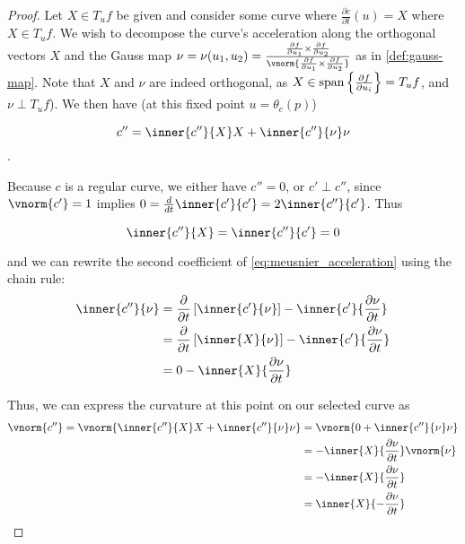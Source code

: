 	\begin{proof}
	Let $X\in T_u f$ be given and consider some curve where $\frac{\partial c}{\partial t}(u) = X$ where $X \in T_u f$. We wish to decompose the curve's acceleration along the  orthogonal vectors $X$ and
	the Gauss map $\nu = \nu(u_1, u_2) =
		\frac{\frac{\partial f}{\partial u_1} \times \frac{\partial f}{\partial u_2}}
		{\vnorm{\frac{\partial f}{\partial u_1} \times \frac{\partial f}{\partial u_2}}}$ as in \cref{def:gauss-map}.
		Note that $X$ and $\nu$ are indeed orthogonal,
		as $ X \in \mathrm{span}\left\{\frac{\partial f}{\partial u_i}\right\} = T_u f$, and
		$\nu \perp T_u f$).
	 We then have (at this fixed point $u=\theta_c(p)$)
		
		\begin{equation} \label{eq:meusnier_acceleration}
			c'' = \inner{c''}{X} X + \inner{c''}{\nu}\nu
			\end{equation}. 
	
	Because $c$ is a regular curve, we either have $c''=0$,
	or $c' \perp c''$, since $\vnorm{c'} = 1$ implies
	$0 = \frac{d}{dt} \inner{c'}{c'} = 2 \inner{c''}{c'} $. Thus
	
		\[ \inner{c''}{X} = \inner{c''}{c'} = 0 \]

	
	 and we can rewrite the second coefficient of \cref{eq:meusnier_acceleration} using the chain rule: %
	\begin{align}
		\inner{c''}{\nu} &=
		\frac{\partial}{\partial t}\left[ \inner{c'}{\nu} \right]
			- \inner{c'}{\frac{\partial \nu}{\partial t}} \\
			&= \frac{\partial}{\partial t}\left[ \inner{X}{\nu} \right]
			- \inner{c'}{\frac{\partial \nu}{\partial t}} \\
			&= 0 - \inner{X}{\frac{\partial \nu}{\partial t}}
			\end{align}
	
	Thus, we can express the curvature at this point on our selected curve as
	\begin{align}
	\vnorm{c''} = \vnorm{\inner{c''}{X} X + \inner{c''}{\nu}\nu}
	&= \vnorm{0 + \inner{c''}{\nu}\nu} \\
	&= - \inner{X}{\frac{\partial \nu}{\partial t}}\vnorm{\nu} \\
	&= - \inner{X}{\frac{\partial \nu}{\partial t}} \\
	&=  \inner{X}{-\frac{\partial \nu}{\partial t}} \label{eq:expand_accel_norm}
	\end{align}
	

\end{proof}
